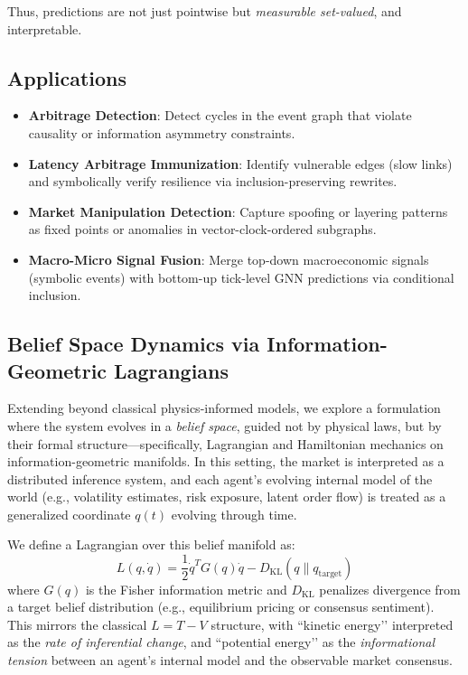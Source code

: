 Thus, predictions are not just pointwise but \emph{measurable set-valued}, and interpretable.

\subsection{Applications}

\begin{itemize}
    \item \textbf{Arbitrage Detection}: Detect cycles in the event graph that violate causality or information asymmetry constraints.
    \item \textbf{Latency Arbitrage Immunization}: Identify vulnerable edges (slow links) and symbolically verify resilience via inclusion-preserving rewrites.
    \item \textbf{Market Manipulation Detection}: Capture spoofing or layering patterns as fixed points or anomalies in vector-clock-ordered subgraphs.
    \item \textbf{Macro-Micro Signal Fusion}: Merge top-down macroeconomic signals (symbolic events) with bottom-up tick-level GNN predictions via conditional inclusion.
\end{itemize}


\subsection{Belief Space Dynamics via Information-Geometric Lagrangians}

Extending beyond classical physics-informed models, we explore a formulation where the system evolves in a \emph{belief space}, guided not by physical laws, but by their formal structure---specifically, Lagrangian and Hamiltonian mechanics on information-geometric manifolds. In this setting, the market is interpreted as a distributed inference system, and each agent’s evolving internal model of the world (e.g., volatility estimates, risk exposure, latent order flow) is treated as a generalized coordinate \( q(t) \) evolving through time.

We define a Lagrangian over this belief manifold as:
\[
L(q, \dot{q}) = \frac{1}{2} \dot{q}^T G(q) \dot{q} - D_{\mathrm{KL}}(q \parallel q_{\mathrm{target}})
\]
where \( G(q) \) is the Fisher information metric and \( D_{\mathrm{KL}} \) penalizes divergence from a target belief distribution (e.g., equilibrium pricing or consensus sentiment). This mirrors the classical \( L = T - V \) structure, with ``kinetic energy’’ interpreted as the \emph{rate of inferential change}, and ``potential energy’’ as the \emph{informational tension} between an agent’s internal model and the observable market consensus.

